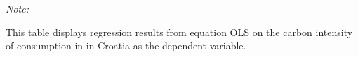\begin{table}[htbp!]
\begin{adjustbox}{width = 1\textwidth, max height = 0.95\textheight, center}
\begin{threeparttable}[b]
         \begin{tablenotes}\item \medskip \textit{Note:}
            \item This table displays regression results from equation OLS on the carbon intensity of consumption in  in Croatia as the dependent variable. 
         \end{tablenotes}
      \end{threeparttable}
   \end{adjustbox}
\end{table}


